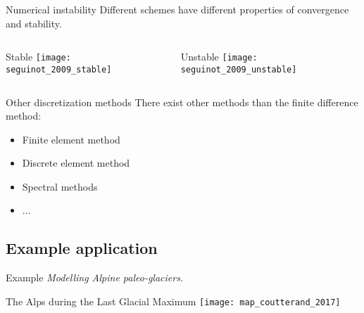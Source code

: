     \begin{frame}{Numerical instability}
      Different schemes have different properties of
      \alert{convergence} and \alert{stability}.
      \begin{columns}
      \column{60mm}
        \begin{block}{Stable}
          \texttt{[image: seguinot\_2009\_stable]}
        \end{block}
      \pause
      \column{60mm}
        \begin{block}{Unstable}
          \texttt{[image: seguinot\_2009\_unstable]}
        \end{block}
      \end{columns}
    \end{frame}

    \begin{frame}{Other discretization methods}
      There exist other methods than the \alert{finite difference} method:
      \begin{itemize}
        \item Finite element method
        \item Discrete element method
        \item Spectral methods
        \item ...
      \end{itemize}
    \end{frame}


\subsection{Example application}

    \begin{sectionframe}{Example}
      \emph{Modelling Alpine paleo-glaciers.}
    \end{sectionframe}


    \begin{frame}{The Alps during the Last Glacial Maximum}
      \texttt{[image: map\_coutterand\_2017]}
    \end{frame}

